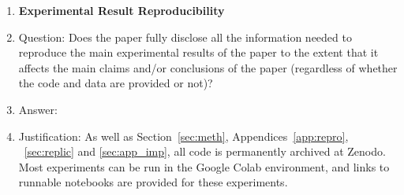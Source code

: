 \begin{enumerate}
    \item {\bf Experimental Result Reproducibility}
    \item[] Question: Does the paper fully disclose all the information needed to reproduce the main experimental results of the paper to the extent that it affects the main claims and/or conclusions of the paper (regardless of whether the code and data are provided or not)?
    \item[] Answer: \answerYes{} %
    \item[] Justification: As well as Section~\ref{sec:meth}, Appendices~\ref{app:repro}, ~\ref{sec:replic} and \ref{sec:app_imp}, all code is permanently archived at Zenodo. Most experiments can be run in the Google Colab environment, and links to runnable notebooks are provided for these experiments.

\end{enumerate}
